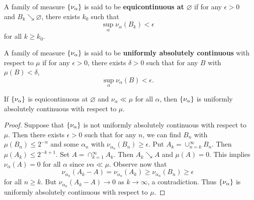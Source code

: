 \begin{definition}
    A family of measure $\left\{ {\nu_\alpha} \right\}$ is said to be \textbf{equicontinuous at $\varnothing$} 
    if for any $\epsilon>0$ and $B_k\searrow \varnothing$, there exists $k_0$ such that 
    \begin{equation*}
        \sup_{\alpha}\nu_\alpha(B_k) < \epsilon
    \end{equation*}
    for all $k\geq k_0$.
\end{definition}

\begin{definition}
    A family of measure $\left\{ {\nu_\alpha} \right\}$ is said to be \textbf{uniformly 
    absolutely continuous} with respect to $\mu$ if for any $\epsilon>0$, 
    there exists $\delta>0$ such that for any $B$ with $\mu(B)<\delta$, 
    \begin{equation*}
        \sup_{\alpha}\nu_\alpha(B) < \epsilon.
    \end{equation*}
\end{definition}

\begin{lemma}\label{lem:mequiconti_unif_abs_conti}
    If $\left\{ {\nu_\alpha} \right\}$ is equicontinuous at $\varnothing$ and 
    $\nu_\alpha\ll\mu$ for all $\alpha$, then $\left\{ {\nu_\alpha} \right\}$ is uniformly 
    absolutely continuous with respect to $\mu$. 
\end{lemma}
\begin{proof}
    Suppose that $\left\{ {\nu_\alpha} \right\}$ is not uniformly absolutely continuous with 
    respect to $\mu$. Then there exists $\epsilon>0$ such that for any $n$, 
    we can find $B_n$ with $\mu(B_n)\leq 2^{-n}$ and some $\alpha_n$ with 
    $\nu_{\alpha_n}(B_n) \geq \epsilon$. Put $A_k = \cup_{n=k}^\infty B_n$. 
    Then $\mu(A_k)\leq 2^{-k+1}$. Set $A = \cap_{k=1}^\infty A_k$. Then 
    $A_k\searrow A$ and $\mu(A) = 0$. This implies $\nu_{\alpha}(A) = 0$ 
    for all $\alpha$ since $\nu\alpha\ll\mu$. Observe now that 
    \begin{equation*}
        \nu_{\alpha_n}(A_k - A) = \nu_{\alpha_n}(A_k) \geq \nu_{\alpha_n}(B_n)
        \geq \epsilon
    \end{equation*}
    for all $n\geq k$. But $\nu_{\alpha_n}(A_k - A)\to 0$ as $k\to\infty$, 
    a contradiction. Thus $\left\{ {\nu_\alpha} \right\}$ is uniformly absolutely continuous 
    with respect to $\mu$.
\end{proof} 

